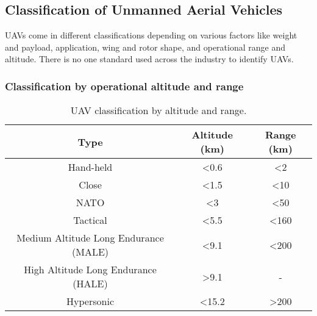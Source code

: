 


\subsection{Classification of Unmanned Aerial Vehicles}
\label{subsubsec:classification-of-uavs}

UAVs come in different classifications depending on various factors like weight and payload, application, wing and rotor shape, and operational range and altitude. There is no one standard used across the industry to identify UAVs.


\subsubsection*{Classification by operational altitude and range}

\begin{table}[H]
    \centering
    \begin{tabular}{|c|c|c|}
        \hline
        Type                                  & Altitude (km) & Range (km) \\
        \hline\hline
        Hand-held                             & <0.6          & <2         \\
        \hline
        Close                                 & <1.5          & <10        \\
        \hline
        NATO                                  & <3            & <50        \\
        \hline
        Tactical                              & <5.5          & <160       \\
        \hline
        Medium Altitude Long Endurance (MALE) & <9.1          & <200       \\
        \hline
        High Altitude Long Endurance (HALE)   & >9.1          & -          \\
        \hline
        Hypersonic                            & <15.2         & >200       \\
        \hline
    \end{tabular}
    \caption{UAV classification by altitude and range.}
    \label{table:uav-classification-by-alt-range}
\end{table}

